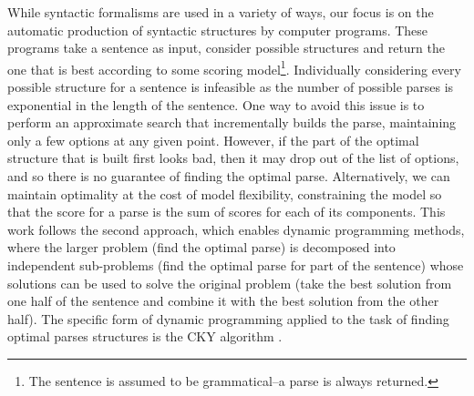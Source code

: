 
While syntactic formalisms are used in a variety of ways, our focus is on the automatic production of syntactic structures by computer programs.
These programs take a sentence as input, consider possible structures and return the one that is best according to some scoring model\footnote{The sentence is assumed to be grammatical--a parse is always returned.}.
Individually considering every possible structure for a sentence is infeasible as the number of possible parses is exponential in the length of the sentence.
One way to avoid this issue is to perform an approximate search that incrementally builds the parse, maintaining only a few options at any given point.
However, if the part of the optimal structure that is built first looks bad, then it may drop out of the list of options, and so there is no guarantee of finding the optimal parse.
Alternatively, we can maintain optimality at the cost of model flexibility, constraining the model so that the score for a parse is the sum of scores for each of its components.
This work follows the second approach, which enables dynamic programming methods, where the larger problem (find the optimal parse) is decomposed into independent sub-problems (find the optimal parse for part of the sentence) whose solutions can be used to solve the original problem (take the best solution from one half of the sentence and combine it with the best solution from the other half).
The specific form of dynamic programming applied to the task of finding optimal parses structures is the CKY algorithm \parencite{Cocke:1969,Kasami:1966,Younger:1967}.

